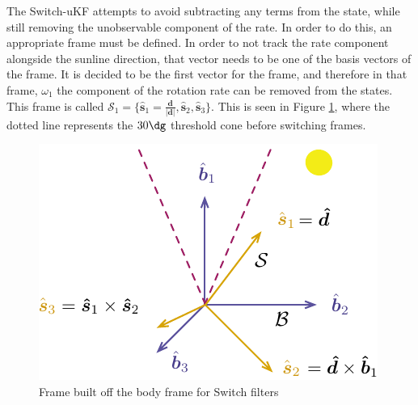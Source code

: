 \documentclass[]{BasiliskReportMemo}
\begin{document}
The Switch-uKF attempts to avoid subtracting any terms from the state, while still removing the unobservable component of the rate. In order to do this, an appropriate frame must be defined.
In order to not track the rate component alongside the sunline direction, that vector needs to be one of the basis vectors of the frame. It is decided to be the first vector for the frame, and therefore in that frame, $\omega_1$ the component of the rotation rate can be removed from the states. 
This frame is called $\mathcal{S}_1 = \{\hat{\bm s}_1 = \frac{\bm d}{|\bm d|}, \hat{\bm s}_2, \hat{\bm s}_3 \}$. This is seen in Figure \ref{fig:Switches}, where the dotted line represents the $30 \dg$ threshold cone before switching frames. 

\begin{figure}[t]
	\centering
	\includegraphics[]{./Figures/Switches}
	\caption{Frame built off the body frame for Switch filters}
	\label{fig:Switches}
\end{figure}
\end{document}
